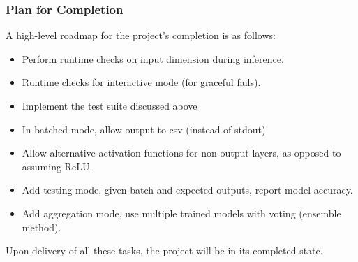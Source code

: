 \documentclass{beamer}
\begin{document}
\begin{frame}
  \frametitle{Plan for Completion}

  A high-level roadmap for the project's completion is as follows:
  \begin{itemize}
    \item Perform runtime checks on input dimension during inference.
    \item Runtime checks for interactive mode (for graceful fails).
    \item Implement the test suite discussed above
    \item In batched mode, allow output to csv (instead of stdout)
    \item Allow alternative activation functions for non-output layers, as opposed to assuming ReLU.
    \item Add testing mode, given batch and expected outputs, report model accuracy.
    \item Add aggregation mode, use multiple trained models with voting (ensemble method).
  \end{itemize}
  Upon delivery of all these tasks, the project will be in its completed state.

\end{frame}
\end{document}
